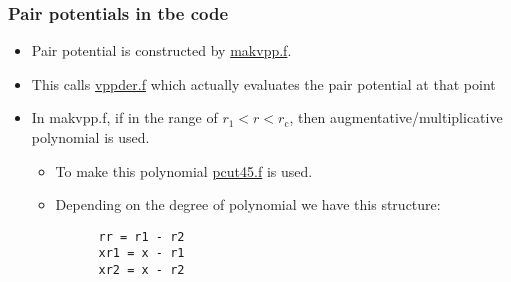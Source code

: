 \documentclass[11pt]{article}
\begin{document}
\subsubsection{Pair potentials in tbe code}
\label{sec-1-6-1}
\begin{itemize}
\item Pair potential is constructed by \href{file:///home/tigany/lm/tb/makvpp.f}{makvpp.f}.
\item This calls \href{file:///home/tigany/lm/tb/vppder.f}{vppder.f} which actually evaluates the pair potential at that
point
\item In makvpp.f, if in the range of $r_1 < r < r_{\text{c}}$, then
augmentative/multiplicative polynomial is used.
\begin{itemize}
\item To make this polynomial \href{file:///home/tigany/lm/tb/pcut45.f}{pcut45.f} is used.
\item Depending on the degree of polynomial we have this structure:
\begin{verbatim}
      rr = r1 - r2
      xr1 = x - r1
      xr2 = x - r2


\end{verbatim}
\end{itemize}
\end{itemize}
\end{document}
